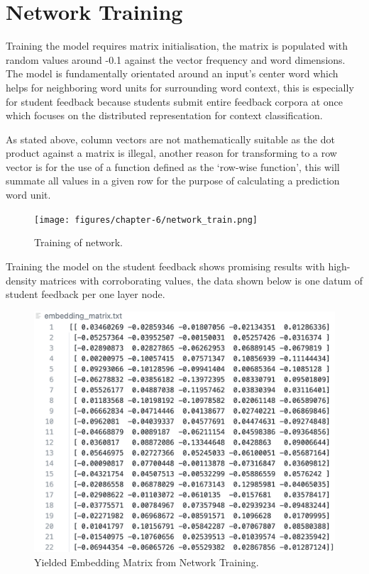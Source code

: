 \section{Network Training}

Training the model requires matrix initialisation, the matrix is populated with random values around -0.1 against the vector frequency and word dimensions. The model is fundamentally orientated around an input's center word which helps for neighboring word units for surrounding word context, this is especially for student feedback because students submit entire feedback corpora at once which focuses on the distributed representation for context classification.

As stated above, column vectors are not mathematically suitable as the dot product against a matrix is illegal, another reason for transforming to a row vector is for the use of a function defined as the `row-wise function', this will summate all values in a given row for the purpose of calculating a prediction word unit.

\begin{figure}[H]
    \centering
    \texttt{[image: figures/chapter-6/network\_train.png]}
    \caption[Training of network]{Training of network.
    \label{fig:network_train}}
\end{figure}

Training the model on the student feedback shows promising results with high-density matrices with corroborating values, the data shown below is one datum of student feedback per one layer node.

\begin{figure}[H]
    \centering
    \includegraphics[width=\textwidth]{figures/chapter-6/EmbeddingMatrix.png}
    \caption[Yielded Embedding Matrix]{Yielded Embedding Matrix from Network Training.
    \label{fig:sample_emmbedding_matrix}}
\end{figure}

